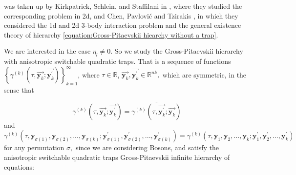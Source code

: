 \documentclass[reqno]{amsart}
\theoremstyle{plain}
\numberwithin{equation}{section}
\begin{document}
was taken up by Kirkpatrick, Schlein, and Staffilani in \cite{Kirpatrick},
where they studied the corresponding problem in 2d, and Chen, Pavlovi\'{c}
and Tzirakis \cite{TChenAndNpGP1, TChenAndNP, TCNPNT}, in which they
considered the 1d and 2d 3-body interaction problem and the general
existence theory of hierarchy \ref{equation:Gross-Pitaevskii hiearchy
without a trap}.

We are interested in the case $\eta _{l}\neq 0$. So we study the
Gross-Pitaevskii hierarchy with anisotropic switchable quadratic traps. That
is a sequence of functions $\left\{ \gamma ^{(k)}(\tau ,\overrightarrow{\mathbf{y}_{k}};\overrightarrow{\mathbf{y}_{k}^{\prime }})\right\}
_{k=1}^{\infty }$, where $\tau \in \mathbb{R}$, $\overrightarrow{\mathbf{y}_{k}},\overrightarrow{\mathbf{y}_{k}^{\prime }}\in \mathbb{R}^{nk},$ which
are symmetric, in the sense that

\begin{equation*}
\gamma ^{(k)}(\tau ,\overrightarrow{\mathbf{y}_{k}};\overrightarrow{\mathbf{y}_{k}^{\prime }})=\overline{\gamma ^{(k)}(\tau ,\overrightarrow{\mathbf{y}_{k}^{\prime }};\overrightarrow{\mathbf{y}_{k}})}
\end{equation*}and\begin{equation*}
\gamma ^{(k)}(\tau ,\mathbf{y}_{\sigma (1)},\mathbf{y}_{\sigma (2)},...,\mathbf{y}_{\sigma (k)};\mathbf{y}_{\sigma (1)}^{\prime },\mathbf{y}_{\sigma
(2)}^{\prime },...,\mathbf{y}_{\sigma (k)}^{\prime })=\gamma ^{(k)}(\tau ,\mathbf{y}_{1},\mathbf{y}_{2},...,\mathbf{y}_{k};\mathbf{y}_{1}^{\prime },\mathbf{y}_{2}^{\prime },...,\mathbf{y}_{k}^{\prime })
\end{equation*}for any permutation $\sigma ,$ since we are considering Bosons, and satisfy
the anisotropic switchable quadratic traps Gross-Pitaevskii infinite
hierarchy of equations:
\end{document}
